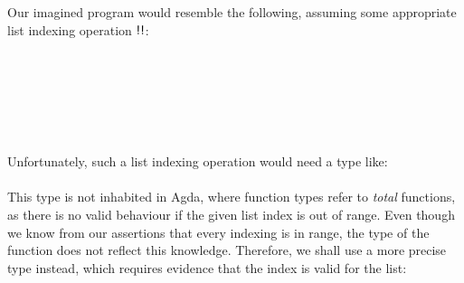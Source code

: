 \documentclass[sigplan]{acmart}%
\begin{document}
Our imagined program would resemble the following, assuming some 
appropriate list indexing operation $\AgdaFunction{!!}$:
\begin{code}
\>[.][@{}l@{}]\<[2226I]%
\>[9]\AgdaSpace{}%
\AgdaSpace{}%
\AgdaSpace{}%
\<%
\\
%
\>[9]\AgdaSpace{}%
\AgdaSpace{}%
\AgdaSpace{}%
\<%
\\
%
\>[9]\AgdaSpace{}%
\AgdaSymbol{(}\AgdaSpace{}%
\AgdaOperator{\AgdaFunction{<}}\AgdaSpace{}%
\AgdaSpace{}%
\AgdaSymbol{)}\AgdaSpace{}%
\<%
\\
\>[9][@{}l@{\AgdaIndent{0}}]%
%
\>[11]\AgdaSpace{}%
\AgdaSpace{}%
\AgdaSymbol{(}\AgdaSpace{}%
\AgdaOperator{\AgdaPrimitive{+}}\AgdaSpace{}%
\AgdaSpace{}%
\AgdaOperator{\AgdaPostulate{!!}}\AgdaSpace{}%
\AgdaSymbol{)}\AgdaSpace{}%
\<%
\\
%
\>[11]\AgdaSpace{}%
\AgdaSpace{}%
\AgdaSymbol{(}\AgdaSpace{}%
\AgdaOperator{\AgdaPrimitive{+}}\AgdaSpace{}%
\AgdaSymbol{)}\<%
\\
%
\>[9]\AgdaSpace{}%
\end{code}
Unfortunately, such a list indexing operation would need a type like:\\[0.5em]
\AgdaOperator{\AgdaPostulate{\AgdaUnderscore{}!!\AgdaUnderscore{}}}\AgdaSpace{}%
\AgdaSymbol{:}\AgdaSpace{}%
\AgdaSpace{}%
\AgdaSpace{}%
\AgdaSpace{}%
\AgdaSpace{}%
\AgdaSpace{}%
\\[0.5em]
This type is not inhabited in Agda, where function types refer to \emph{total} functions, 
as there is no valid behaviour if the given list index is out of range. Even though 
we know from our assertions that every indexing is in range, the type of the 
function does not reflect this knowledge. Therefore, we shall use a more precise type 
instead, which requires evidence that the index is valid for the list:
\end{document}
